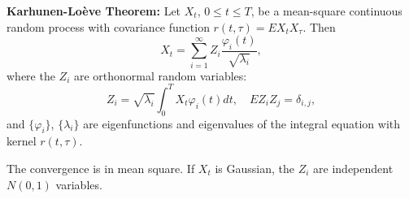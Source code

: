 \textbf{Karhunen-Loève Theorem:} Let $X_t$, $0 \leq t \leq T$, be a mean-square continuous random process with covariance function $r(t, \tau) = EX_t X_\tau$. Then
$$X_t = \sum_{i=1}^{\infty} Z_i \frac{\varphi_i(t)}{\sqrt{\lambda_i}},$$
where the $Z_i$ are orthonormal random variables:
$$Z_i = \sqrt{\lambda_i} \int_0^T X_t \varphi_i(t) dt, \quad E Z_i Z_j = \delta_{i,j},$$
and $\{\varphi_i\}$, $\{\lambda_i\}$ are eigenfunctions and eigenvalues of the integral equation with kernel $r(t, \tau)$.

The convergence is in mean square. If $X_t$ is Gaussian, the $Z_i$ are independent $N(0,1)$ variables.
